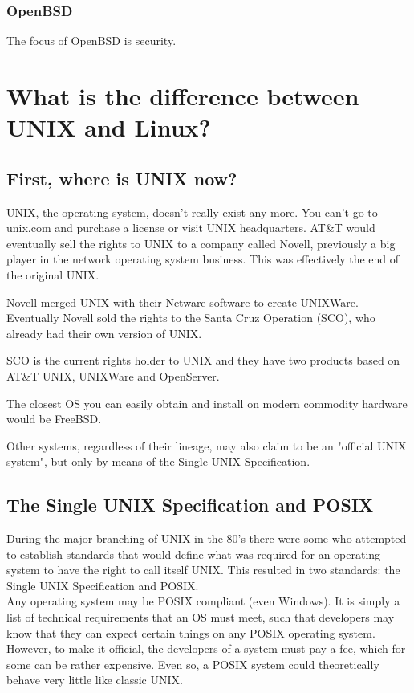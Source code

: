 \subsubsection{OpenBSD}

The focus of OpenBSD is security. 

\section{What is the difference between UNIX and Linux?}

\subsection{First, where is UNIX now?}

UNIX, the operating system, doesn't really exist any more.  You can't go to unix.com and purchase a license or visit UNIX headquarters.  AT\&T would eventually sell the rights to UNIX to a company called Novell, previously a big player in the network operating system business.  This was effectively the end of the original UNIX.

Novell merged UNIX with their Netware software to create UNIXWare.  Eventually Novell sold the rights to the Santa Cruz Operation (SCO), who already had their own version of UNIX.

SCO is the current rights holder to UNIX and they have two products based on AT\&T UNIX, UNIXWare and OpenServer.

The closest OS you can easily obtain and install on modern commodity hardware would be FreeBSD.

Other systems, regardless of their lineage, may also claim to be an "official UNIX system", but only by means of the Single UNIX Specification.

\subsection{The Single UNIX Specification and POSIX}

During the major branching of UNIX in the 80's there were some who attempted to establish standards that would define what was required for an operating system to have the right to call itself UNIX.  This resulted in two standards: the Single UNIX Specification and POSIX.\\

Any operating system may be POSIX compliant (even Windows).  It is simply a list of technical requirements that an OS must meet, such that developers may know that they can expect certain things on any POSIX operating system.  However, to make it official, the developers of a system must pay a fee, which for some can be rather expensive.  Even so, a POSIX system could theoretically behave very little like classic UNIX.\\

